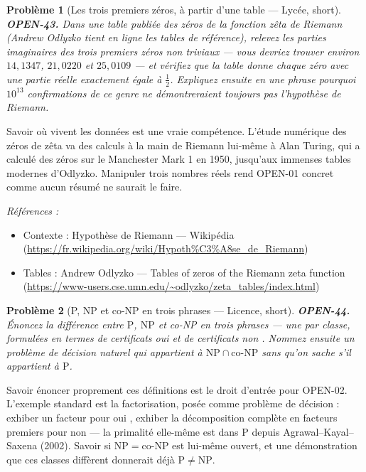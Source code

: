\documentclass[11pt]{article}
\newtheorem{problem}{Problème}
\newenvironment{refs}{\par\small\noindent\emph{Références :}\begin{itemize}\setlength\itemsep{0pt}}{\end{itemize}\normalsize}
\begin{document}
\bigskip

\begin{problem}[{Les trois premiers zéros, à partir d'une table --- Lycée, short}]
\textbf{OPEN-43.} Dans une table publiée des zéros de la fonction zêta
de Riemann (Andrew Odlyzko tient en ligne les tables de référence), relevez les parties
imaginaires des trois premiers zéros non triviaux --- vous devriez trouver environ
$ 14{,}1347 $, $ 21{,}0220 $ et $ 25{,}0109 $ --- et vérifiez que la table donne
chaque zéro avec une partie réelle exactement égale à $ \tfrac{1}{2} $. Expliquez
ensuite en une phrase pourquoi $ 10^{13} $ confirmations de ce genre ne démontreraient
toujours pas l'hypothèse de Riemann.
\end{problem}

\noindent Savoir où vivent les données est une vraie compétence. L'étude
numérique des zéros de zêta va des calculs à la main de Riemann lui-même à Alan Turing,
qui a calculé des zéros sur le Manchester Mark 1 en 1950, jusqu'aux immenses tables
modernes d'Odlyzko. Manipuler trois nombres réels rend OPEN-01 concret comme aucun résumé
ne saurait le faire.

\begin{refs}
\item Contexte : Hypothèse de Riemann --- Wikipédia (\url{https://fr.wikipedia.org/wiki/Hypoth%C3%A8se_de_Riemann})
\item Tables : Andrew Odlyzko --- Tables of zeros of the Riemann zeta function (\url{https://www-users.cse.umn.edu/~odlyzko/zeta_tables/index.html})
\end{refs}

\bigskip

\begin{problem}[{P, NP et co-NP en trois phrases --- Licence, short}]
\textbf{OPEN-44.} Énoncez la différence entre $ \mathrm{P} $,
$ \mathrm{NP} $ et co-NP en trois phrases --- une par classe, formulées en termes de
certificats \og{} oui \fg{} et de certificats \og{} non \fg{}. Nommez ensuite un problème de décision
naturel qui appartient à $ \mathrm{NP} \cap \text{co-}\mathrm{NP} $ sans qu'on sache
s'il appartient à $ \mathrm{P} $.
\end{problem}

\noindent Savoir énoncer proprement ces définitions est le droit d'entrée pour
OPEN-02. L'exemple standard est la factorisation, posée comme problème de décision :
exhiber un facteur pour \og{} oui \fg{}, exhiber la décomposition complète en facteurs premiers
pour \og{} non \fg{} --- la primalité elle-même est dans $ \mathrm{P} $ depuis
Agrawal--Kayal--Saxena (2002). Savoir si $ \mathrm{NP} = \text{co-}\mathrm{NP} $ est
lui-même ouvert, et une démonstration que ces classes diffèrent donnerait déjà
$ \mathrm{P} \neq \mathrm{NP} $.
\end{document}
